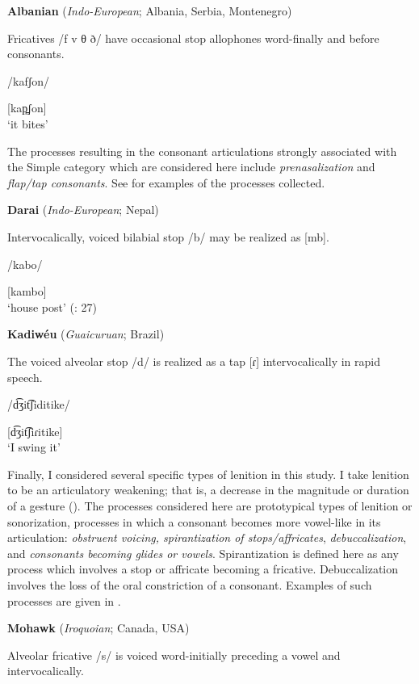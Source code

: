 \ea\label{ex:7.11}
  \textbf{Albanian} (\textit{Indo-European}; Albania, Serbia, Montenegro)

Fricatives /f v θ ð/ have occasional stop allophones word-finally and before consonants.

/kafʃon/

[kap̪ʃon]\\
\glt ‘it bites’
\citep[16]{Newmark1957}
\z

  The processes resulting in the consonant articulations strongly associated with the Simple category which are considered here include \textit{prenasalization} and \textit{flap/tap consonants}. See  for examples of the processes collected.

\ea\label{ex:7.12}
  \textbf{Darai} (\textit{Indo-European}; Nepal)

Intervocalically, voiced bilabial stop /b/ may be realized as [mb].

/kabo/

[kambo]\\
\glt ‘house post’
(\citealt{KotapishKotapish1973}: 27)
\z

\ea\label{ex:7.13}
  \textbf{Kadiwéu} (\textit{Guaicuruan}; Brazil)

The voiced alveolar stop /d/ is realized as a tap [ɾ] intervocalically in rapid speech.

/d͡ʒit͡ʃiditike/

[d͡ʒit͡ʃiɾitike]\\
\glt ‘I swing it’
\citep[16]{Sandalo1997}
\z

  Finally, I considered several specific types of lenition in this study. I take lenition to be an articulatory weakening; that is, a decrease in the magnitude or duration of a gesture (\citealt{BrowmanGoldstein1992b,MowreyPagliuca1995,BybeeEasterday2019}). The processes considered here are prototypical types of lenition or sonorization, processes in which a consonant becomes more vowel-like in its articulation: \textit{obstruent voicing, spirantization of stops/affricates}, \textit{debuccalization}, and \textit{consonants becoming glides or vowels}. Spirantization is defined here as any process which involves a stop or affricate becoming a fricative. Debuccalization involves the loss of the oral constriction of a consonant. Examples of such processes are given in .

\ea\label{ex:7.14}
  \textbf{Mohawk} (\textit{Iroquoian}; Canada, USA)

Alveolar fricative /s/ is voiced word-initially preceding a vowel and intervocalically.

